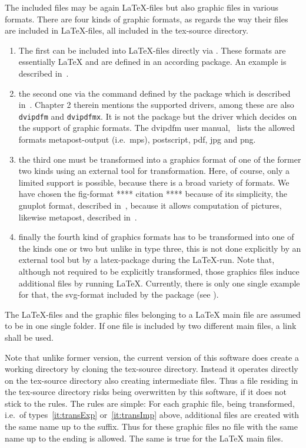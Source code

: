 \documentclass[12pt]{book}
\newcommand{\gls}[1]{#1}
\begin{document}
The included files may be again \LaTeX-files but also graphic files 
in various formats. 
There are four kinds of graphic formats, 
as regards the way their files are included in \LaTeX-files, 
all included in the tex-source directory. 
%
\begin{enumerate}
\item
The first can be included into \LaTeX-files directly via . 
These formats are essentially \LaTeX{} and are defined in an according package. 
An example is  described in~\cite{EEpic}. 
\item
the second one via the command  
defined by the package  
which is described in~\cite{GraX}. 
Chapter 2 therein mentions the supported drivers, 
among these are also \texttt{dvipdfm} and \texttt{dvipdfmx}. 
It is not the package but the driver 
which decides on the support of graphic formats. 
The dvipdfm user manual,~\cite{DviPdfMx} lists the allowed formats 
metapost-output (i.e.~\gls{mps}), postscript, 
\gls{pdf}, \gls{jpg} and \gls{png}. 
\item\label{it:transExp}
the third one must be transformed into a graphics format 
of one of the former two kinds using an external tool for transformation. 
Here, of course, only a limited support is possible, 
because there is a broad variety of formats. 
We have chosen the \gls{fig}-format **** citation **** because of its simplicity, 
the gnuplot format, described in~\cite{GnuPlot}, 
because it allows computation of pictures, 
likewise metapost, described in~\cite{MPost}. 
\item\label{it:transImp}
finally the fourth kind of graphics formats 
has to be transformed into one of the kinds one or two 
but unlike in type three, this is not done explicitly 
by an external tool but by a latex-package during the \LaTeX-run. 
Note that, although not required to be explicitly transformed, 
those graphics files induce additional files 
by running \LaTeX. 
Currently, there is only one single example for that, 
the \gls{svg}-format included by the package  (see \cite{SvgP}). 
\end{enumerate}

The \LaTeX-files and the graphic files belonging to a \LaTeX{} main file 
are assumed to be in one single folder. 
If one file is included by two different main files, 
a link shall be used. 

Note that unlike former version, 
the current version of this software does create a working directory 
by cloning the tex-source directory. 
Instead it operates directly on the tex-source directory 
also creating intermediate files. 
Thus a file residing in the tex-source directory 
risks being overwritten by this software, 
if it does not stick to the rules. 
The rules are simple: 
For each graphic file, being transformed, 
i.e.~of types~\ref{it:transExp} or~\ref{it:transImp} above, 
additional files are created with the same name up to the suffix. 
Thus for these graphic files no file with the same name 
up to the ending is allowed. 
The same is true for the \LaTeX{} main files. 
\end{document}
